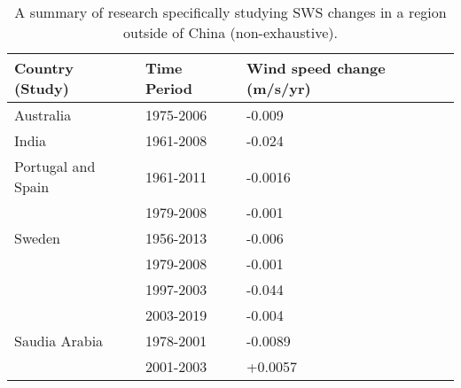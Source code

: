 \begin{table}\centering
	\caption[Summary of surface wind speed trends in global literature]{A summary of research specifically studying \ac{SWS} changes in a region outside of China (non-exhaustive).}
	\label{tab:nsws}	
	\begin{tabular}{@{}p{8.5cm}p{2.5cm}p{2cm}@{}}
		\toprule
		\textbf{Country (Study)} & \textbf{Time Period} & \textbf{Wind speed change (m/s/yr)} \\ \midrule
		Australia \citep{mcvicar2008} & 1975-2006 & -0.009 \\ \midrule
		India \citep{jaswal2013} & 1961-2008 & -0.024 \\ \midrule
		Portugal and Spain \citep{azorin-molina2014} & 1961-2011 & -0.0016 \\
		& 1979-2008 & -0.001 \\ \midrule
		Sweden \citep{minola2016, minola2022} & 1956-2013 & -0.006 \\
		& 1979-2008 & -0.001 \\
		& 1997-2003 & -0.044 \\
		& 2003-2019 & -0.004 \\ \midrule
		Saudia Arabia \citep{azorin-molina2018} & 1978-2001 & -0.0089 \\
		& 2001-2003 & +0.0057 \\
		\bottomrule
	\end{tabular}
\end{table}

